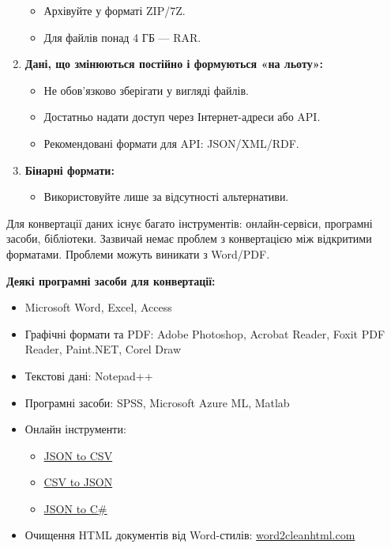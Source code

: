 \begin{enumerate}
\begin{itemize}
            \item Архівуйте у форматі ZIP/7Z.  
            \item Для файлів понад 4 ГБ — RAR.
        \end{itemize}
    \item \textbf{Дані, що змінюються постійно і формуються «на льоту»:}  
        \begin{itemize}
            \item Не обов'язково зберігати у вигляді файлів.  
            \item Достатньо надати доступ через Інтернет-адреси або API.  
            \item Рекомендовані формати для API: JSON/XML/RDF.
        \end{itemize}
    \item \textbf{Бінарні формати:}  
        \begin{itemize}
            \item Використовуйте лише за відсутності альтернативи.
        \end{itemize}
\end{enumerate}

Для конвертації даних існує багато інструментів: онлайн-сервіси, програмні засоби, бібліотеки. Зазвичай немає проблем з конвертацією між відкритими форматами. Проблеми можуть виникати з Word/PDF.

\textbf{Деякі програмні засоби для конвертації:}

\begin{itemize}
    \item Microsoft Word, Excel, Access
    \item Графічні формати та PDF: Adobe Photoshop, Acrobat Reader, Foxit PDF Reader, Paint.NET, Corel Draw
    \item Текстові дані: Notepad++
    \item Програмні засоби: SPSS, Microsoft Azure ML, Matlab
    \item Онлайн інструменти:  
        \begin{itemize}
            \item \href{http://konklone.io/json/}{JSON to CSV}  
            \item \href{http://www.convertcsv.com/csv-to-json.htm}{CSV to JSON}  
            \item \href{http://json2csharp.com/}{JSON to C\#}
        \end{itemize}
    \item Очищення HTML документів від Word-стилів: \href{https://word2cleanhtml.com/}{word2cleanhtml.com}
\end{itemize}

